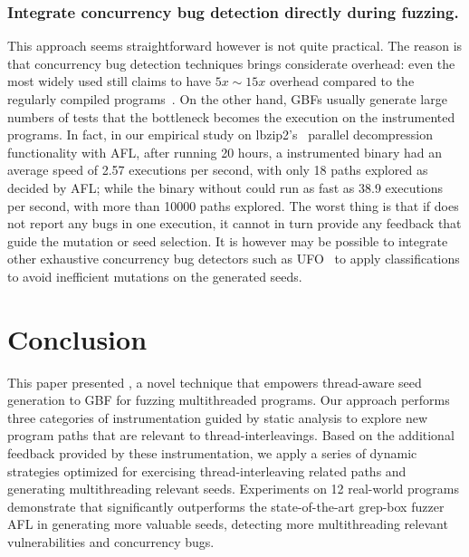 \subsubsection{Integrate concurrency bug detection directly during fuzzing.}\label{sec:discuss_ts_cbugs}
This approach seems straightforward however is not quite practical. The reason is that concurrency bug detection techniques brings considerate overhead: even the most widely used \ts still claims to have $5x\sim 15x$ overhead compared to the regularly compiled programs~\cite{kcc:tsan,lwn_tsan}. On the other hand, GBFs usually generate large numbers of tests that the bottleneck becomes the execution on the \ts instrumented programs. In fact, in our empirical study on lbzip2's~\cite{lbzip2} parallel decompression functionality with AFL, after running 20 hours, a \ts instrumented binary had an average speed of 2.57 executions per second, with only 18 paths explored as decided by AFL; while the binary without \ts could run as fast as 38.9 executions per second, with more than 10000 paths explored. The worst thing is that if \ts does not report any bugs in one execution, it cannot in turn provide any feedback that guide the mutation or seed selection. It is however may be possible to integrate other exhaustive concurrency bug detectors such as UFO~\cite{icse18_ufo} to apply classifications to avoid inefficient mutations on the generated seeds.






\section{Conclusion}
This paper presented \mtfuzz, a novel technique that empowers thread-aware seed generation to GBF
for fuzzing multithreaded programs. Our approach performs three categories of instrumentation guided by static analysis to explore new program paths that are relevant to thread-interleavings. Based on the additional feedback provided by these instrumentation, we apply a series of dynamic strategies optimized for exercising thread-interleaving related paths and generating multithreading relevant seeds. 
Experiments on 12 real-world programs demonstrate that \mtfuzz significantly outperforms the state-of-the-art grep-box fuzzer AFL in generating more valuable seeds, detecting more multithreading relevant vulnerabilities and concurrency bugs.


